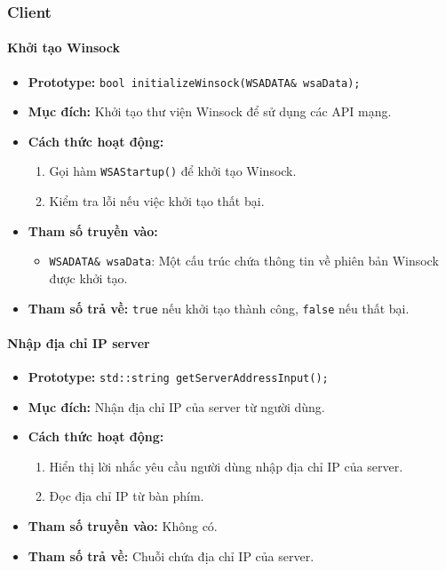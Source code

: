\subsubsection{Client}
\paragraph{\textbf{Khởi tạo Winsock}}
\begin{itemize}
    \item \textbf{Prototype:} \texttt{bool initializeWinsock(WSADATA\& wsaData);}
    
    \item \textbf{Mục đích:} Khởi tạo thư viện Winsock để sử dụng các API mạng.
    
    \item \textbf{Cách thức hoạt động:} 
    \begin{enumerate}
        \item Gọi hàm \texttt{WSAStartup()} để khởi tạo Winsock.
        \item Kiểm tra lỗi nếu việc khởi tạo thất bại.
    \end{enumerate}
    
    \item \textbf{Tham số truyền vào:} 
    \begin{itemize}
        \item \texttt{WSADATA\& wsaData}: Một cấu trúc chứa thông tin về phiên bản Winsock được khởi tạo.
    \end{itemize}
    
    \item \textbf{Tham số trả về:} \texttt{true} nếu khởi tạo thành công, \texttt{false} nếu thất bại.
\end{itemize}

\paragraph{\textbf{Nhập địa chỉ IP server}}
\begin{itemize}
    \item \textbf{Prototype:} \texttt{std::string getServerAddressInput();}
    
    \item \textbf{Mục đích:} Nhận địa chỉ IP của server từ người dùng.
    
    \item \textbf{Cách thức hoạt động:} 
    \begin{enumerate}
        \item Hiển thị lời nhắc yêu cầu người dùng nhập địa chỉ IP của server.
        \item Đọc địa chỉ IP từ bàn phím.
    \end{enumerate}
    
    \item \textbf{Tham số truyền vào:} Không có.
    
    \item \textbf{Tham số trả về:} Chuỗi chứa địa chỉ IP của server.
\end{itemize}

